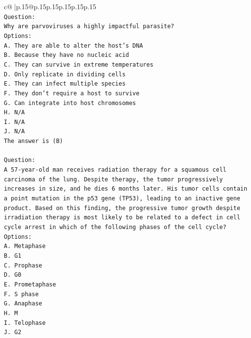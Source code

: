 \documentclass{article}
\begin{document}
{\begin{supertabular}{c@{$\;$}|p{.15\linewidth}@{}p{.15\linewidth}p{.15\linewidth}p{.15\linewidth}p{.15\linewidth}p{.15\linewidth}}
{{{\\ 
\texttt{Question:} \\
\texttt{Why are parvoviruses a highly impactful parasite?} \\
\texttt{Options:} \\
\texttt{A. They are able to alter the host's DNA} \\
\texttt{B. Because they have no nucleic acid} \\
\texttt{C. They can survive in extreme temperatures} \\
\texttt{D. Only replicate in dividing cells} \\
\texttt{E. They can infect multiple species} \\
\texttt{F. They don't require a host to survive} \\
\texttt{G. Can integrate into host chromosomes} \\
\texttt{H. N/A} \\
\texttt{I. N/A} \\
\texttt{J. N/A} \\
\texttt{The answer is (B)} \\
\\ 
\texttt{Question:} \\
\texttt{A 57{-}year{-}old man receives radiation therapy for a squamous cell carcinoma of the lung. Despite therapy, the tumor progressively increases in size, and he dies 6 months later. His tumor cells contain a point mutation in the p53 gene (TP53), leading to an inactive gene product. Based on this finding, the progressive tumor growth despite irradiation therapy is most likely to be related to a defect in cell cycle arrest in which of the following phases of the cell cycle?} \\
\texttt{Options:} \\
\texttt{A. Metaphase} \\
\texttt{B. G1} \\
\texttt{C. Prophase} \\
\texttt{D. G0} \\
\texttt{E. Prometaphase} \\
\texttt{F. S phase} \\
\texttt{G. Anaphase} \\
\texttt{H. M} \\
\texttt{I. Telophase} \\
\texttt{J. G2} \\
            }
        }
    }
     \\ \\


\end{supertabular}}
\end{document}
